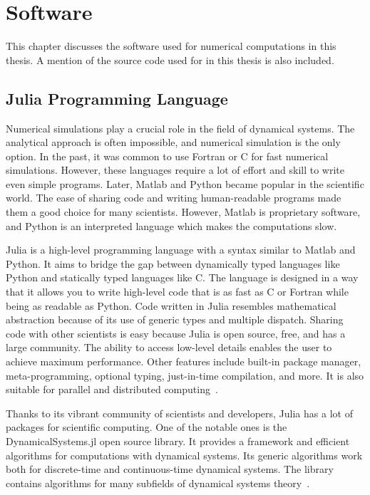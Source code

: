 \chapter{Software}
\label{sec:software}

This chapter discusses the software used for numerical computations in this thesis.
A mention of the source code used for in this thesis is also included.

\section{Julia Programming Language}
Numerical simulations play a crucial role in the field of dynamical systems.
The analytical approach is often impossible, and numerical simulation is the only option.
In the past, it was common to use Fortran or C for fast numerical simulations.
However, these languages require a lot of effort and skill to write even simple programs.
Later, Matlab and Python became popular in the scientific world.
The ease of sharing code and writing human-readable programs made them a good choice for many scientists.
However, Matlab is proprietary software, and Python is an interpreted language which makes the computations slow.
\par
Julia is a high-level programming language with a syntax similar to Matlab and Python.
It aims to bridge the gap between dynamically typed languages like Python and statically typed languages like C.
The language is designed in a way that it allows you to write high-level code that is as fast as C or Fortran while being as readable as Python.
Code written in Julia resembles mathematical abstraction because of its use of generic types and multiple dispatch. 
Sharing code with other scientists is easy because Julia is open source, free, and has a large community. 
The ability to access low-level details enables the user to achieve maximum performance.
Other features include built-in package manager, meta-programming, optional typing, just-in-time compilation, and more.
It is also suitable for parallel and distributed computing~\cite{Bezanson2017,Bezanson20181024}.
\par
Thanks to its vibrant community of scientists and developers, Julia has a lot of packages for scientific computing.
One of the notable ones is the DynamicalSystems.jl open source library.
It provides a framework and efficient algorithms for computations with dynamical systems.
Its generic algorithms work both for discrete-time and continuous-time dynamical systems.
The library contains algorithms for many subfields of dynamical systems theory~\cite{Datseris2018}.
